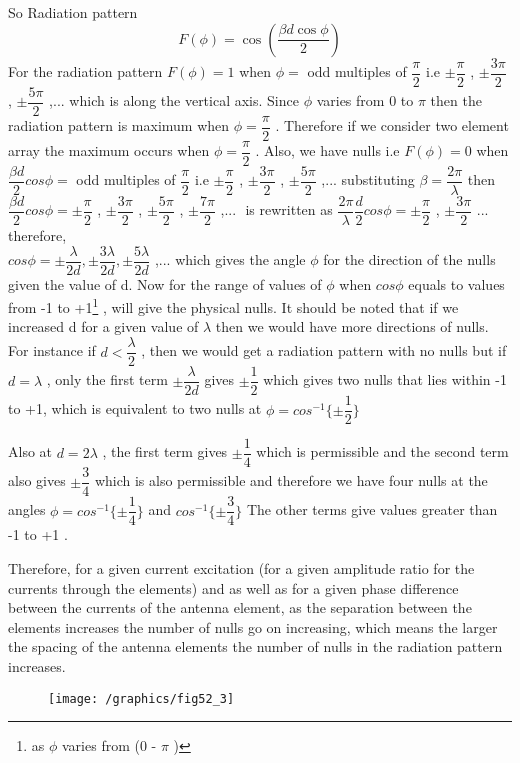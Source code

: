 So Radiation pattern
$$F(\phi) = \cos\left(\frac{\beta d\cos\phi}{2}\right)$$
For the radiation pattern $ F(\phi) = 1 $ when $\phi = $ odd multiples of $ \dfrac{\pi}{2} $ i.e $ \pm \dfrac{\pi}{2} $ , $ \pm \dfrac{3\pi}{2} $ , $ \pm \dfrac{5\pi}{2} $ ,... which is along the vertical axis. Since $ \phi $ varies from 0 to $ \pi $ then the radiation pattern is maximum when $ \phi = \dfrac{\pi}{2} $ . Therefore if we consider two element array the maximum occurs when $ \phi = \dfrac{\pi}{2} $ . Also, we have nulls i.e $ F(\phi) = 0 $ when $ \dfrac{\beta d}{2} cos\phi = $ odd multiples of $ \dfrac{\pi}{2} $  i.e  $ \pm \dfrac{\pi}{2} $ , $ \pm \dfrac{3\pi}{2} $ , $ \pm \dfrac{5\pi}{2} $ ,... substituting $ \beta = \dfrac{2\pi}{\lambda} $ then $ \dfrac{\beta d}{2} cos\phi = \pm \dfrac{\pi}{2} $ , $ \pm \dfrac{3\pi}{2} $ , $ \pm \dfrac{5\pi}{2} $ , $ \pm \dfrac{7\pi}{2} $ ,... $ $ is rewritten as $ \dfrac{2\pi}{\lambda} \dfrac{d}{2} cos \phi = \pm \dfrac{\pi}{2} $ , $ \pm \dfrac{3\pi}{2} $ ... therefore,
\\ $ cos \phi = \pm \dfrac{\lambda}{2d} , \pm \dfrac{3\lambda}{2d} , \pm \dfrac{5\lambda}{2d} $ ,... which gives the angle $ \phi $ for the direction of the nulls given the value of d. Now for the range of values of $ \phi $ when $ cos\phi $ equals to values from -1 to +1\footnote{as $ \phi $ varies from (0 - $ \pi $ )} , will give the physical nulls. It should be noted that if we increased d for a given value of $ \lambda $ then we would have more directions of nulls. For instance if $ d < \dfrac{\lambda}{2} $ , then we would get a radiation pattern with no nulls but if $ d = \lambda $ , only the first term $ \pm \dfrac{\lambda}{2d} $ gives $ \pm \dfrac{1}{2} $ which gives two nulls that lies within -1 to +1, which is equivalent to two nulls  at $ \phi = cos^{-1} \{\pm \dfrac{1}{2} \}  $  

Also at $ d = 2 \lambda $ , the first term gives $ \pm \dfrac{1}{4} $ which is permissible and the second term also gives  $ \pm \dfrac{3}{4} $ which is also permissible  and therefore we have four nulls at the angles $ \phi = cos^{-1} \{\pm \dfrac{1}{4} \}  $ and $ cos^{-1} \{\pm \dfrac{3}{4} \}  $ 
The other terms give values greater than -1 to +1 .

Therefore, for a given current excitation (for a given amplitude ratio for the currents through the elements) and as well as for a given phase difference between the currents of the antenna element, as the separation between the elements increases the number of nulls go on increasing, which means the larger the spacing of the antenna elements the number of nulls in the radiation pattern increases.
\begin{figure}[h]
\centering
\texttt{[image: /graphics/fig52\_3]}
\caption{}
\label{52.3}
\end{figure}

